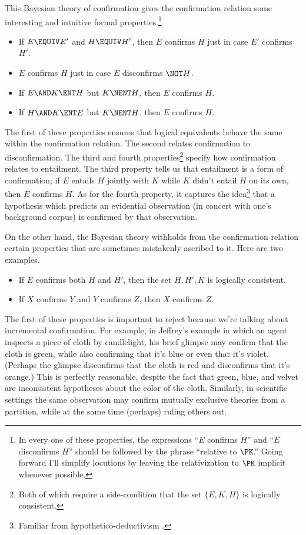 This Bayesian theory of confirmation gives the confirmation relation some interesting and intuitive formal properties.\footnote
{In every one of these properties, the expressions ``$E$ confirms $H$'' and ``$E$ disconfirms $H$'' should be followed by the phrase ``relative to $\PK$.'' Going forward I'll simplify locutions by leaving the relativization to $\PK$ implicit whenever possible.}
\begin{itemize}
\item{If $E \EQUIV E'$ and $H \EQUIV H'$, then $E$ confirms $H$ just in case $E'$ confirms $H'$.}
\item{$E$ confirms $H$ just in case $E$ disconfirms $\NOT H$.}
\item{If $E \AND K \ENT H$ but $K \NENT H$, then $E$ confirms $H$.}
\item{If $H \AND K \ENT E$ but $K \NENT H$, then $E$ confirms $H$.}
\end{itemize}
The first of these properties ensures that logical equivalents behave the same within the confirmation relation. The second relates confirmation to disconfirmation. The third and fourth properties\footnote
{Both of which require a side-condition that the set $\{E, K, H\}$ is logically consistent.} 
 specify how confirmation relates to entailment. The third property tells us that entailment is a form of confirmation; if $E$ entails $H$ jointly with $K$ while $K$ didn't entail $H$ on its own, then $E$ confirms $H$. As for the fourth property, it captures the idea\footnote
{Familiar from hypothetico-deductivism \citep[Section 2]{CrupiSEP}.}
 that a hypothesis which predicts an evidential observation (in concert with one's background corpus) is confirmed by that observation.
 
On the other hand, the Bayesian theory withholds from the confirmation relation certain properties that are sometimes mistakenly ascribed to it. Here are two examples.
\begin{itemize}
\item{If $E$ confirms both $H$ and $H'$, then the set ${H, H', K}$ is logically consistent.}
\item{If $X$ confirms $Y$ and $Y$ confirms $Z$, then $X$ confirms $Z$.}
\end{itemize} 
The first of these properties is important to reject because we're talking about incremental confirmation. For example, in Jeffrey's example in which an agent inspects a piece of cloth by candlelight, his brief glimpse may confirm that the cloth is green, while also confirming that it's blue or even that it's violet. (Perhaps the glimpse disconfirms that the cloth is red and disconfirms that it's orange.) This is perfectly reasonable, despite the fact that green, blue, and velvet are inconsistent hypotheses about the color of the cloth. Similarly, in scientific settings the same observation may confirm mutually exclusive theories from a partition, while at the same time (perhaps) ruling others out.

